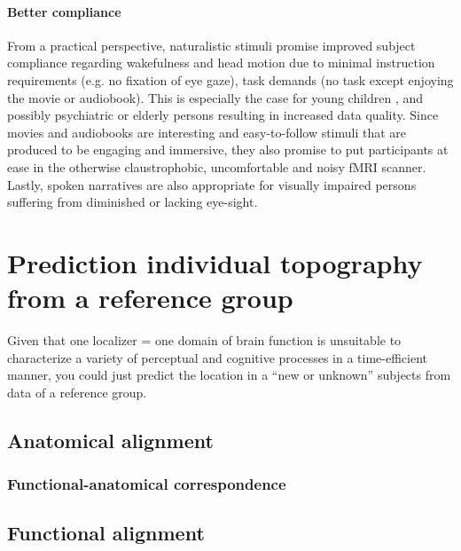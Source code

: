 \paragraph{Better compliance}

%
From a practical perspective, naturalistic stimuli promise improved subject
compliance regarding wakefulness and head motion due to minimal instruction
requirements (e.g. no fixation of eye gaze), task demands (no task except
enjoying the movie or audiobook).
%
This is especially the case for young children \citep{vanderwal2015inscapes},
and possibly psychiatric \citep{eickhoff2020towards} or elderly persons
resulting in increased data quality.
%
Since movies and audiobooks are interesting and easy-to-follow stimuli that are
produced to be engaging and immersive, they also promise to put participants at
ease in the otherwise claustrophobic, uncomfortable and noisy fMRI scanner.
%
Lastly, spoken narratives are also appropriate for visually impaired persons
suffering from diminished or lacking eye-sight.


\section{Prediction individual topography from a reference group}

Given that one localizer = one domain of brain function is unsuitable to
characterize a variety of perceptual and cognitive processes in a time-efficient
manner, you could just predict the location in a ``new or  unknown'' subjects
from data of a reference group.


\subsection{Anatomical alignment}



\subsubsection{Functional-anatomical correspondence}


\subsection{Functional alignment}


